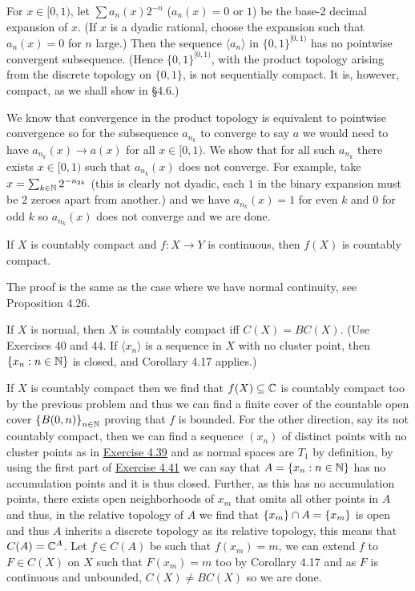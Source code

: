 \documentclass[12pt,a4paper]{article}
\begin{document}
\begin{problem}\label{prob:4-43}
For $x \in [0,1)$, let $\sum a_n(x) 2^{-n}$ ($a_n(x) = 0$ or $1$) be the base-2 decimal expansion of $x$. (If $x$ is a dyadic rational, choose the expansion such that $a_n(x) = 0$ for $n$ large.) Then the sequence $\langle a_n \rangle$ in $\{0,1\}^{[0,1)}$ has no pointwise convergent subsequence. (Hence $\{0,1\}^{[0,1)}$, with the product topology arising from the discrete topology on $\{0,1\}$, is not sequentially compact. It is, however, compact, as we shall show in \S 4.6.)
\end{problem}
\begin{solution}
    We know that convergence in the product topology is equivalent to pointwise convergence so for the subsequence $a_{n_k}$ to converge to say $a$ we would need to have $a_{n_k}(x)\to a(x)$ for all $x\in[0,1).$ 
    We show that for all such $a_{n_k}$ there exists $x\in[0,1)$ such that $a_{n_k}(x)$ does not converge. 
    For example, take $x=\sum_{k\in\mathbb{N}}2^{-n_{2k}}$ (this is clearly not dyadic, each $1$ in the binary expansion must be $2$ zeroes apart from another.) and we have $a_{n_k}(x)=1$ for even $k$ and $0$ for odd $k$ so $a_{n_k}(x)$ does not converge and we are done. 
\end{solution}
\begin{problem}\label{prob:4-44}
If $X$ is countably compact and $f : X \to Y$ is continuous, then $f(X)$ is countably compact.
\end{problem}
\begin{solution}
The proof is the same as the case where we have normal continuity, see Proposition 4.26.
\end{solution}
\begin{problem}\label{prob:4-45}
If $X$ is normal, then $X$ is countably compact iff $C(X) = BC(X)$. (Use Exercises 40 and 44. If $\langle x_n \rangle$ is a sequence in $X$ with no cluster point, then $\{x_n : n \in \mathbb{N}\}$ is closed, and Corollary 4.17 applies.)
\end{problem}
\begin{solution}
    If $X$ is countably compact then we find that $f(X) \subseteq\mathbb{C}$ is countably compact too by the previous problem and thus we can find a finite cover of the countable open cover $ \qty{B(0,n)}_{n\in\mathbb{N}}$ proving that $f$ is bounded. 
    For the other direction, say its not countably compact, then we can find a sequence $(x_n)$ of distinct points with no cluster points as in \hyperref[prob:4-39]{Exercise 4.39} and as normal spaces are $T_1$ by definition, by using the first part of \hyperref[prob:4-41]{Exercise 4.41} we can say that $A=\qty{x_n:n\in\mathbb{N}}$ has no accumulation points and it is thus closed. 
    Further, as this has no accumulation points, there exists open neighborhoods of $x_m$ that omits all other points in $A$ and thus, in the relative topology of $A$ we find that $ \qty{x_m}\cap A= \qty{x_m}$ is open and thus $A$ inherits a discrete topology as its relative topology, this means that $C(A)=\mathbb{C}^A$. 
    Let $f\in C(A)$ be such that $f(x_m)=m$, we can extend $f$ to $F\in C(X)$ on $X$ such that $F(x_m)=m$ too by Corollary 4.17 and as $F$ is continuous and unbounded, $C(X)\neq BC(X)$ so we are done. 
\end{solution}
\end{document}
